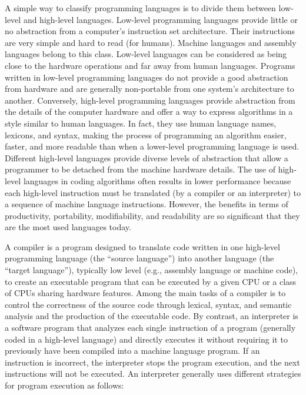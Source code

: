 A simple way to classify programming languages is to divide them between low-level and high-level languages. Low-level programming languages provide little or no abstraction from a computer's instruction set architecture. Their instructions are very simple and hard to read (for humans). Machine languages and assembly languages belong to this class. Low-level languages can be considered as being close to the hardware operations and far away from human languages. Programs written in low-level programming languages do not provide a good abstraction from hardware and are generally non-portable from one system's architecture to another. Conversely, high-level programming languages provide abstraction from the details of the computer hardware and offer a way to express algorithms in a style similar to human languages. In fact, they use human language names, lexicons, and syntax, making the process of programming an algorithm easier, faster, and more readable than when a lower-level programming language is used. Different high-level languages provide diverse levels of abstraction that allow a programmer to be detached from the machine hardware details. The use of high-level languages in coding algorithms often results in lower performance because each high-level instruction must be translated (by a compiler or an interpreter) to a sequence of machine language instructions. However, the benefits in terms of productivity, portability, modifiability, and readability are so significant that they are the most used languages today.

A compiler is a program designed to translate code written in one high-level programming language (the ``source language'') into another language (the \hbox{``target} language''), typically low level (e.g., assembly language or machine code), to create an executable program that can be executed by a given CPU or a class of CPUs sharing hardware features. Among the main tasks of a compiler is to control the correctness of the source code through lexical, syntax, and semantic analysis and the production of the executable code. By contrast, an interpreter is a software program that analyzes each single instruction of a program (generally coded in a high-level language) and directly executes it without requiring it to previously have been compiled into a machine language program. If an instruction is incorrect, the interpreter stops the program execution, and the next instructions will not be executed. An interpreter generally uses different strategies for program execution as follows:

